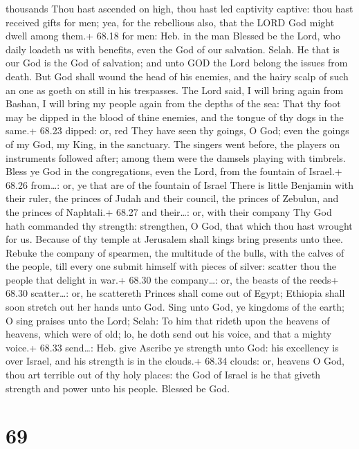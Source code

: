 thousands  Thou hast ascended on high, thou hast led
captivity captive: thou hast received gifts for men; yea, for the
rebellious also, that the LORD God might dwell among them.+ 68.18 for
men: Heb. in the man  Blessed be the Lord, who daily
loadeth us with benefits, even the God of our salvation. Selah.
 He that is our God is the God of salvation; and unto GOD
the Lord belong the issues from death.  But God shall wound
the head of his enemies, and the hairy scalp of such an one as goeth on
still in his trespasses.  The Lord said, I will bring again
from Bashan, I will bring my people again from the depths of the sea:
 That thy foot may be dipped in the blood of thine enemies,
and the tongue of thy dogs in the same.+ 68.23 dipped: or, red
 They have seen thy goings, O God; even the goings of my
God, my King, in the sanctuary.  The singers went before,
the players on instruments followed after; among them were the damsels
playing with timbrels.  Bless ye God in the congregations,
even the Lord, from the fountain of Israel.+ 68.26 from\ldots: or, ye
that are of the fountain of Israel  There is little
Benjamin with their ruler, the princes of Judah and their council, the
princes of Zebulun, and the princes of Naphtali.+ 68.27 and their\ldots:
or, with their company  Thy God hath commanded thy
strength: strengthen, O God, that which thou hast wrought for us.
 Because of thy temple at Jerusalem shall kings bring
presents unto thee.  Rebuke the company of spearmen, the
multitude of the bulls, with the calves of the people, till every one
submit himself with pieces of silver: scatter thou the people that
delight in war.+ 68.30 the company\ldots: or, the beasts of the reeds+
68.30 scatter\ldots: or, he scattereth  Princes shall come
out of Egypt; Ethiopia shall soon stretch out her hands unto God.
 Sing unto God, ye kingdoms of the earth; O sing praises
unto the Lord; Selah:  To him that rideth upon the heavens
of heavens, which were of old; lo, he doth send out his voice, and that
a mighty voice.+ 68.33 send\ldots: Heb. give  Ascribe ye
strength unto God: his excellency is over Israel, and his strength is in
the clouds.+ 68.34 clouds: or, heavens  O God, thou art
terrible out of thy holy places: the God of Israel is he that giveth
strength and power unto his people. Blessed be God.

\hypertarget{section-68}{%
\section{69}\label{section-68}}


